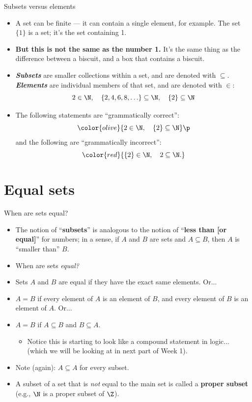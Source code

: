 \documentclass[11pt,aspectratio=1610]{beamer}
\begin{document}
\begin{frame}{Subsets versus elements}\p
	\begin{itemize}
		\item A set can be finite --- it can contain a single element, for example. The set $\{1\}$ is a set; it's the set containing 1. \p
		\item \textbf{But this is not the same as the number 1.} It's the same thing as the difference between a biscuit, and a box that contains a biscuit. \p
		\item \textit{\textbf{Subsets}} are smaller collections within a set, and are denoted with $\subseteq$. \emph{\textbf{Elements}} are individual members of that set, and are denoted with $\in$: \p
		\[
		2 \in \N, \quad \{2, 4, 6, 8, \ldots\} \subseteq \N, \quad \{2\} \subseteq \N
		\]
		\item The following statements are ``grammatically correct'': 
		\[
		\color{olive}{2 \in \N, \quad \{2\} \subseteq \N} \p
		\]
		and the following are ``grammatically incorrect'': 
		\[
		\color{red}{\{2\} \in \N, \quad 2 \subseteq \N.} 
		\]
	\end{itemize}
\end{frame}

\section{Equal sets}

\begin{frame}{When are sets equal?}
	\begin{itemize}\itemsep3mm
		\item The notion of ``\textbf{subsets}'' is analogous to the notion of ``\textbf{less than [or equal]}'' for numbers; in a sense, if $A$ and $B$ are sets and $A \subseteq B$, then $A$ is ``smaller than'' $B$. \p
		\item When are sets \emph{equal?} \p
		\item Sets $A$ and $B$ are equal if they have the exact same elements. Or... \p
		\item $A = B$ if every element of $A$ is an element of $B$, and every element of $B$ is an element of $A$. Or... \p
		\item $A = B$ if $A \subseteq B$ and $B \subseteq A$. \p
		\begin{itemize}
			\item Notice this is starting to look like a compound statement in logic... (which we will be looking at in next part of Week 1).
		\end{itemize}\p
		\item Note (again): $A \subseteq A$ for every subset. \p
		\item A subset of a set that is \emph{not} equal to the main set is called a \textbf{proper subset} (e.g., $\N$ is a proper subset of $\Z$). 
	\end{itemize}
\end{frame}
\end{document}
